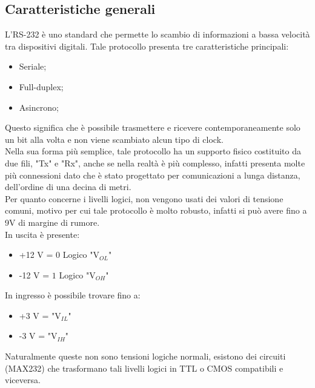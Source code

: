 \documentclass[a4paper, titlepage]{article}
\begin{document}
\subsection{Caratteristiche generali}
L'RS-232 è uno standard che permette lo scambio di informazioni a bassa velocità tra dispositivi digitali.
Tale protocollo presenta tre caratteristiche principali:
\begin{itemize}
\item Seriale; 
\item Full-duplex;
\item Asincrono;
\end{itemize}
Questo significa che è possibile trasmettere e ricevere contemporaneamente solo un bit alla volta  e non viene scambiato alcun tipo di clock.\\
Nella sua forma più semplice, tale protocollo ha un supporto fisico costituito da due fili,  "Tx" e  "Rx", anche se nella realtà è più complesso, infatti presenta molte più connessioni dato che è stato progettato per comunicazioni a lunga distanza, dell'ordine di una decina di metri.\\
Per quanto concerne i livelli logici, non vengono usati dei valori di tensione comuni, motivo per cui tale protocollo è molto robusto, infatti si può avere fino a 9V di margine di rumore.\\
In uscita è presente:
\begin{itemize}
\item +12 V = $0$ Logico "V$_{OL}$"
\item -12 V = $1$ Logico "V$_{OH}$"
\end{itemize}
In ingresso è possibile trovare fino a:
\begin{itemize}
\item +3 V = "V$_{IL}$"
\item -3 V = "V$_{IH}$"
\end{itemize}
Naturalmente queste non sono tensioni logiche normali, esistono dei circuiti (MAX232) che trasformano tali livelli logici in TTL o CMOS compatibili e viceversa.
\end{document}
